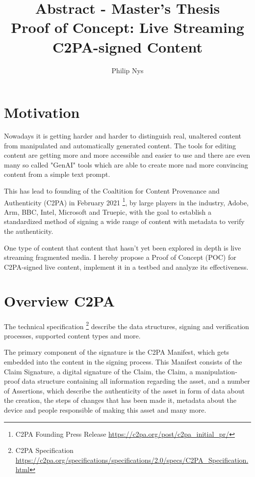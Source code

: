 \documentclass[a4paper]{article}
\author{Philip Nys}
\title{Abstract - Master's Thesis\\Proof of Concept: Live Streaming C2PA-signed Content}
\begin{document}
\maketitle


\section{Motivation}

Nowadays it is getting harder and harder to distinguish real, unaltered content from manipulated and automatically generated content. The tools for editing content are getting more and more accessible and easier to use and there are even many so called "GenAI" tools which are able to create more nad more convincing content from a simple text prompt.

This has lead to founding of the Coaltition for Content Provenance and Authenticity (C2PA) in February 2021 \footnote{C2PA Founding Press Release \url{https://c2pa.org/post/c2pa_initial_pr/}}, by large players in the industry, Adobe, Arm, BBC, Intel, Microsoft and Truepic, with the goal to establish a standardized method of signing a wide range of content with metadata to verify the authenticity.

One type of content that content that hasn't yet been explored in depth is live streaming fragmented media. I hereby propose a Proof of Concept (POC) for C2PA-signed live content, implement it in a testbed and analyze its effectiveness.

\section{Overview C2PA}

The technical specification \footnote{C2PA Specification \url{https://c2pa.org/specifications/specifications/2.0/specs/C2PA_Specification.html}} describe the data structures, signing and verification processes, supported content types and more.

The primary component of the signature is the C2PA Manifest, which gets embedded into the content in the signing process. This Manifest consists of the Claim Signature, a digital signature of the Claim, the Claim, a manipulation-proof data structure containing all information regarding the asset, and a number of Assertions, which describe the authenticity of the asset in form of data about the creation, the steps of changes that has been made it, metadata about the device and people responsible of making this asset and many more.
\end{document}
